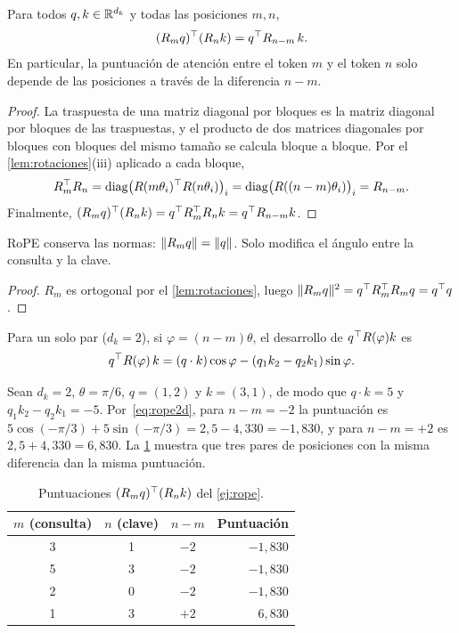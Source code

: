 \begin{teorema}\label{teo:rope}
Para todos $q,k\in\mathbb{R}^{d_k}$ y todas las posiciones $m,n$,
\[
(R_mq)^{\top}(R_nk)=q^{\top} R_{n-m}\,k.
\]
En particular, la puntuación de atención entre el token $m$ y el token $n$ solo depende de las posiciones a través de la diferencia $n-m$.
\end{teorema}

\begin{proof}
La traspuesta de una matriz diagonal por bloques es la matriz diagonal por bloques de las traspuestas, y el producto de dos matrices diagonales por bloques con bloques del mismo tamaño se calcula bloque a bloque. Por el \cref{lem:rotaciones}(iii) aplicado a cada bloque,
\[
R_m^{\top} R_n=\operatorname{diag}\bigl(R(m\theta_i)^{\top} R(n\theta_i)\bigr)_{i}=\operatorname{diag}\bigl(R((n-m)\theta_i)\bigr)_{i}=R_{n-m}.
\]
Finalmente, $(R_mq)^{\top}(R_nk)=q^{\top} R_m^{\top} R_nk=q^{\top} R_{n-m}k$.
\end{proof}

\begin{corolario}\label{cor:rope-norma}
RoPE conserva las normas: $\lVert R_mq\rVert=\lVert q\rVert$. Solo modifica el ángulo entre la consulta y la clave.
\end{corolario}

\begin{proof}
$R_m$ es ortogonal por el \cref{lem:rotaciones}, luego $\lVert R_mq\rVert^{2}=q^{\top} R_m^{\top} R_mq=q^{\top} q$.
\end{proof}

Para un solo par ($d_k=2$), si $\varphi=(n-m)\theta$, el desarrollo de $q^{\top} R(\varphi)k$ es
\begin{equation}\label{eq:rope2d}
q^{\top} R(\varphi)\,k=(q\cdot k)\cos\varphi-(q_1k_2-q_2k_1)\sin\varphi .
\end{equation}

\begin{ejemplo}\label{ej:rope}
Sean $d_k=2$, $\theta=\pi/6$, $q=(1,2)$ y $k=(3,1)$, de modo que $q\cdot k=5$ y $q_1k_2-q_2k_1=-5$. Por~\eqref{eq:rope2d}, para $n-m=-2$ la puntuación es $5\cos(-\pi/3)+5\sin(-\pi/3)=2{,}5-4{,}330=-1{,}830$, y para $n-m=+2$ es $2{,}5+4{,}330=6{,}830$. La \cref{tab:rope} muestra que tres pares de posiciones con la misma diferencia dan la misma puntuación.
\end{ejemplo}

\begin{table}[ht]
\centering\small
\caption{Puntuaciones $(R_mq)^{\top}(R_nk)$ del \cref{ej:rope}.}\label{tab:rope}
\begin{tabular}{@{}cccr@{}}
\toprule
$m$ (consulta) & $n$ (clave) & $n-m$ & Puntuación \\
\midrule
3 & 1 & $-2$ & $-1{,}830$ \\
5 & 3 & $-2$ & $-1{,}830$ \\
2 & 0 & $-2$ & $-1{,}830$ \\
1 & 3 & $+2$ & $6{,}830$ \\
\bottomrule
\end{tabular}
\end{table}

